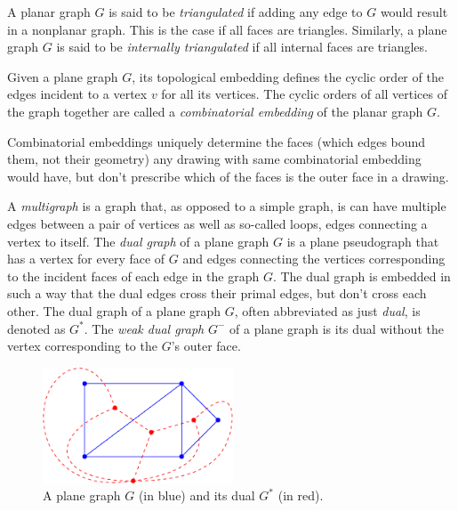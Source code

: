 \begin{definition}
	A planar graph $G$ is said to be \emph{triangulated} if adding any edge to $G$ would result in a nonplanar graph. This is the case if all faces are triangles.
	Similarly, a plane graph $G$ is said to be \emph{internally triangulated} if all internal faces are triangles.
\end{definition}

\begin{definition}
	Given a plane graph $G$, its topological embedding defines the cyclic order of the edges incident to a vertex $v$ for all its vertices. The cyclic orders of all vertices of the graph together are called a \emph{combinatorial embedding} of the planar graph $G$.
\end{definition}

Combinatorial embeddings uniquely determine the faces (which edges bound them, not their geometry) any drawing with same combinatorial embedding would have, but don't prescribe which of the faces is the outer face in a drawing.

\begin{definition}
	A \emph{multigraph} is a graph that, as opposed to a simple graph, is can have multiple edges between a pair of vertices as well as so-called loops, \ie{} edges connecting a vertex to itself.
	The \emph{dual graph} of a plane graph $G$ is a plane pseudograph that has a vertex for every face of $G$ and edges connecting the vertices corresponding to the incident faces of each edge in the graph $G$. The dual graph is embedded in such a way that the dual edges cross their primal edges, but don't cross each other. The dual graph of a plane graph $G$, often abbreviated as just \emph{dual}, is denoted as $G^*$.
	The \emph{weak dual graph} $G^-$ of a plane graph is its dual without the vertex corresponding to the $G$'s outer face\cite{fleischner1974}.
\end{definition}

\begin{figure}[H]
	\centering\includegraphics[height=130px]{Resources/Preliminaries-Dual.pdf}
	\caption{A plane graph $G$ (in blue) and its dual $G^*$ (in red).}
	\label{fig:preliminaries-dual}
\end{figure}

